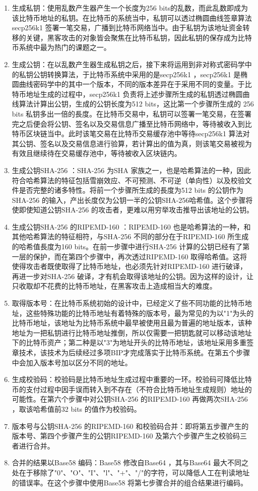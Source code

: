 			\begin{enumerate}
				\item 生成私钥：使用乱数产生器产生一个长度为256 bits的乱数，而此乱数即成为该比特币地址的私钥。在比特币的系统当中，私钥可以透过椭圆曲线签章算法secp256k1 签署一笔交易，广播到⽐特币网络当中。由于私钥为该地址资金转移的关键，黑客攻击的对象皆会聚焦在比特币私钥，因此私钥的保存成为比特币系统中最为热门的课题之一。
				\item 生成公钥：在以乱数产生器生成私钥之后，接下来将运用到非对称式密码学中的私钥公钥转换算法，于比特币系统中采用的是secp256k1 ，secp256k1 是椭圆曲线密码学中的其中一个版本，不同的版本差异在于采用不同的变量。于比特币地址生成的过程中，secp256k1 负责将上述步骤所生成的私钥透过椭圆曲线算法计算出公钥，生成的公钥长度为512 bits，这比第一个步骤所生成的 256 bits 私钥多出⼀倍的⾧度。在比特币交易中，私钥可以签署一笔交易，在签署完之后便会将公钥、签名以及交易信息广播至比特币网络中，等待被收入到比特币区块链当中。此时该笔交易在⽐特币交易缓存池中等待secp256k1 算法对其公钥、签名以及交易信息进⾏验算，若计算出的值为真，则该笔交易被视为有效且继续待在交易缓存池中，等待被收⼊区块链内。
				\item 生成公钥SHA-256 ：SHA-256 为SHA 家族之一，也是哈希算法的一种，因此符合哈希算法的特征包括雪崩效应、不可预测、不可逆（单向性）以及校验文件是否完整的诸多特性。将前一个步骤所⽣成的⾧度为512 bits 的公钥作为SHA-256 的输入，产出长度仅为公钥一半的公钥SHA-256哈希值。这个步骤将使即使知道公钥SHA-256 的攻击者，更难以⽤穷举攻击推导出该地址的公钥。
				\item 生成公钥SHA-256 的RIPEMD-160 ：RIPEMD-160 也是哈希算法的⼀种，和其他哈希算法的特征相符，与SHA-256 不同的部分在于RIPEMD-160 所⽣成的哈希值⾧度为160 bits。在前一步骤中进⾏SHA-256 计算的公钥已经有了第⼀层的保护，⽽在第四个步骤中，再次透过RIPEMD-160 取得哈希值。这将使得攻击者既使取得了⽐特币地址，也必须先针对RIPEMD-160 进⾏破译，再进⼀步对SHA-256 破译，才有机会取得该地址的公钥。因为这样的设计，让只收取却不花费的⽐特币地址，在⿊客攻击上造成相当⼤的难度。
				\item 取得版本号：在比特币系统初始的设计中，已经定义了些不同功能的比特币地址，这些特殊功能的比特币地址有着特殊的版本号，最为常见的为以"1"为头的比特币地址，该地址为比特币系统中最早被使用且最为普遍的地址版本，该种地址为一把私钥进行比特币地址推倒，所以仅需要一把钥匙就可以移动该地址下的比特币资产；第二种是以"3"为地址开头的比特币地址，该地址采用多重签章技术，该技术为后续经过多项BIP才完成落实于比特币系统。在第五个步骤中会加入版本号加以区分不同的地址。
				\item 生成校验码：校验码是⽐特币地址⽣成过程中重要的⼀环。校验码可降低⽐特币的⽀付过程中因⼿误而转⼊到不存在（不符合⽐特币地址⽣成规则）地址的可能性。在第六个步骤中对公钥SHA-256 的RIPEMD-160 再做两次SHA-256 ，取该哈希值前32 bits 的值作为校验码。
				\item 版本号与公钥SHA-256 的RIPEMD-160 和校验码合并：即将第五步骤产⽣的版本号、第四个步骤产⽣的公钥RIPEMD-160 及第六个步骤产⽣之校验码三者进行合并。
				\item 合并的结果以Base58 编码：Base58 修改⾃Base64 ，其与Base64 最⼤不同之处在于移除了"0"、"O"、"I"、"l"、"+"、"/"的字符，可以降低⼈⼯在判读地址的错误率。在这个步骤中使⽤Base58 将第七步骤合并的组合结果进⾏编码。
			\end{enumerate}

